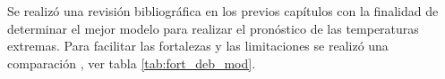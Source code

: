 




Se realizó una revisión bibliográfica en los previos capítulos con la finalidad de determinar el mejor modelo para realizar el pronóstico de las temperaturas extremas. Para facilitar las fortalezas y las limitaciones se realizó una comparación , ver tabla \ref{tab:fort_deb_mod}.



